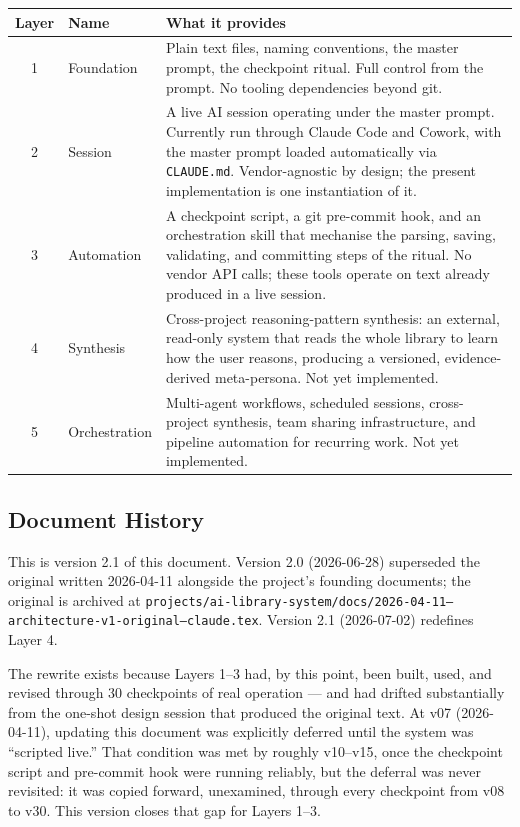 \documentclass[12pt,letterpaper]{article}
\begin{document}
\begin{center}
\begin{tabular}{@{}clp{8cm}@{}}
\toprule
\textbf{Layer} & \textbf{Name} & \textbf{What it provides} \\
\midrule
1 & Foundation & Plain text files, naming conventions, the master prompt,
                 the checkpoint ritual. Full control from the prompt.
                 No tooling dependencies beyond git. \\
2 & Session & A live AI session operating under the master prompt.
              Currently run through Claude Code and Cowork, with the
              master prompt loaded automatically via \texttt{CLAUDE.md}.
              Vendor-agnostic by design; the present implementation is
              one instantiation of it. \\
3 & Automation & A checkpoint script, a git pre-commit hook, and an
                 orchestration skill that mechanise the parsing, saving,
                 validating, and committing steps of the ritual. No
                 vendor API calls; these tools operate on text already
                 produced in a live session. \\
4 & Synthesis & Cross-project reasoning-pattern synthesis: an external,
                read-only system that reads the whole library to learn
                how the user reasons, producing a versioned,
                evidence-derived meta-persona. Not yet implemented. \\
5 & Orchestration & Multi-agent workflows, scheduled sessions, cross-project
                    synthesis, team sharing infrastructure, and pipeline
                    automation for recurring work. Not yet implemented. \\
\bottomrule
\end{tabular}
\end{center}

\subsection{Document History}

This is version 2.1 of this document. Version 2.0 (2026-06-28)
superseded the original written 2026-04-11 alongside the project's
founding documents; the original is archived at
\texttt{projects/ai-library-system/docs/2026-04-11--architecture-v1-original--claude.tex}.
Version 2.1 (2026-07-02) redefines Layer 4.

The rewrite exists because Layers 1--3 had, by this point, been built,
used, and revised through 30 checkpoints of real operation --- and had
drifted substantially from the one-shot design session that produced
the original text. At v07 (2026-04-11), updating this document was
explicitly deferred until the system was ``scripted live.'' That
condition was met by roughly v10--v15, once the checkpoint script and
pre-commit hook were running reliably, but the deferral was never
revisited: it was copied forward, unexamined, through every checkpoint
from v08 to v30. This version closes that gap for Layers 1--3.
\end{document}
